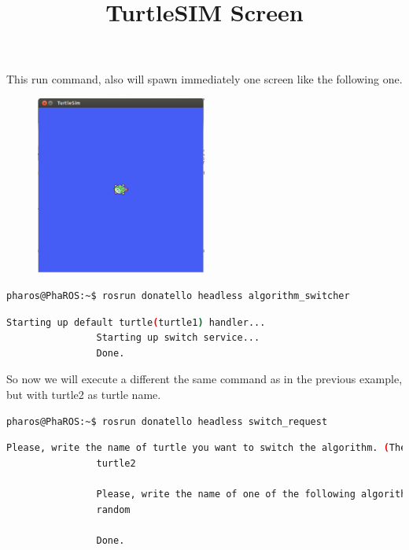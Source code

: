 \documentclass[a4paper,10pt,twoside]{book}
\begin{document}
				This run command, also will spawn immediately one screen like the following one. 
			
			\begin{figure}[!htbp]
  		
  				\centering
    				\includegraphics[width=0.5\textwidth]{TurtleSIM.png}
				
				\centering
				\title{TurtleSIM Screen}
			\end{figure}
			
			
							
			
			\begin{lstlisting}[language=bash,title={Starting up Donatello/AlgorithmSwitcher}]
				pharos@PhaROS:~$ rosrun donatello headless algorithm_switcher
			\end{lstlisting}
			
			\begin{lstlisting}[language=bash,title={Starting up Donatello/AlgorithmSwitcher - Output }]
				Starting up default turtle(turtle1) handler... 
				Starting up switch service... 
				Done.
			\end{lstlisting}
			

			
			So now we will execute a different the same command as in the previous example, but with turtle2 as turtle name. 
			
			
			\begin{lstlisting}[language=bash,title={Starting up Donatello/SwitchRequest}]
				pharos@PhaROS:~$ rosrun donatello headless switch_request
			\end{lstlisting}
			
			
			\begin{lstlisting}[language=bash,title={Starting up Donatello/SwitchRequest - Interactive Output }]
				Please, write the name of turtle you want to switch the algorithm. (The default one is called turtle1) 
				turtle2

				Please, write the name of one of the following algorithms  #('random' 'quiet' 'pursuiter' 'circular' 'pharo')
				random
				
				Done.
			\end{lstlisting}
\end{document}

